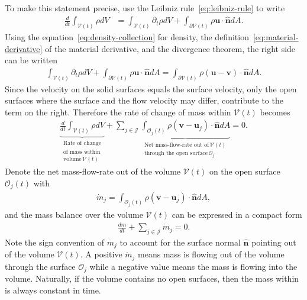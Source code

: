 To make this statement precise, use the Leibniz rule~\eqref{eq:leibniz-rule} to write
\begin{align}
    \frac{d}{dt}\int_{\mathcal{V}(t)}\rho dV
    &=\int_{\mathcal{V}(t)}\partial_t\rho dV
    +\int_{\partial \mathcal{V}(t)}\rho\bm{u}\cdot \bm{\hat{n}}dA.
\end{align}
Using the equation~\eqref{eq:density-collection} for density, the definition~\eqref{eq:material-derivative} of the material derivative, and the divergence theorem, the right side can be written
\begin{align}
    \int_{\mathcal{V}(t)}\partial_t\rho dV+\int_{\partial \mathcal{V}(t)}\rho\bm{u}\cdot\bm{\hat{n}} dA=\int_{\partial \mathcal{V}(t)}\rho(\bm{u}-\bm{v})\cdot\bm{\hat{n}} dA.
\end{align}
Since the velocity on the solid surfaces equals the surface velocity, only the open surfaces where the surface and the flow velocity may differ, contribute to the term on the right. Therefore the rate of change of mass within $\mathcal{V}(t)$ becomes
\begin{align}
    \underbrace{\frac{d}{dt}\int_{\mathcal{V}(t)}\rho dV}_{\substack{\text{Rate of change}\\\text{of mass within}\\\text{volume}\,\mathcal{V}(t)}}+\sum_{j\in\mathcal{J}}\underbrace{\int_{\mathcal{O}_j(t)}\rho(\bm{v}-\bm{u}_{j})\cdot\bm{\hat{n}} dA}_{\substack{\text{Net mass-flow-rate out of}\,\mathcal{V}(t)\\\text{through the open surface}\,\mathcal{O}_{j}}}=0.
\end{align}
Denote the net mass-flow-rate out of the volume $\mathcal{V}(t)$ on the open surface $\mathcal{O}_j(t)$ with
\begin{align}\label{eq:mass-flow-rate-defition}
    \dot{m}_j=\int_{\mathcal{O}_j(t)}\rho(\bm{v}-\bm{u}_j)\cdot\bm{\hat{n}}dA,
\end{align}
and the mass balance over the volume $\mathcal{V}(t)$ can be expressed in a compact form
\begin{align*}
    \frac{dm}{dt}+\sum_{j\in\mathcal{J}}\dot{m}_j=0.
\end{align*}
Note the sign convention of $\dot{m}_j$ to account for the surface normal $\bm{\hat{n}}$ pointing out of the volume $\mathcal{V}(t)$. A positive $\dot{m}_j$ means mass is flowing out of the volume through the surface $\mathcal{O}_j$ while a negative value means the mass is flowing into the volume. Naturally, if the volume contains no open surfaces, then the mass within is always constant in time. 

